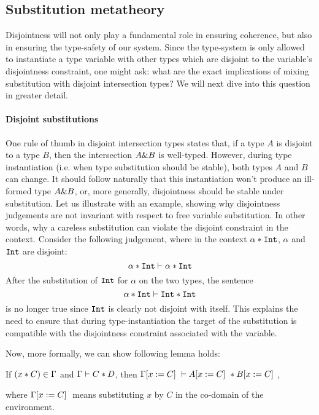 \subsection{Substitution metatheory}

Disjointness will not only play a fundamental role in ensuring coherence, but also in 
ensuring the type-safety of our system.
Since the type-system is only allowed to instantiate a type variable with 
other types which are disjoint to the variable's disjointness constraint, one might ask:
what are the exact implications of mixing substitution with disjoint intersection types? 
We will next dive into this question in greater detail.


\paragraph{Disjoint substitutions}
One rule of thumb in disjoint intersection types states that, if a type $A$ is 
disjoint to a type $B$, then the intersection $A \inter B$ is well-typed.
However, during type instantiation (i.e. when type substitution should be stable), both types
$A$ and $B$ can change.
It should follow naturally that this instantiation won't produce an ill-formed type $A \inter B$,
or, more generally, disjointness should be stable under substitution. 
Let us illustrate with an example, showing why disjointness judgements are not invariant with
respect to free variable substitution.
In other words, why a careless substitution can violate the disjoint constraint in the context. 
Consider the following judgement, where in the context $\alpha
\disjoint \tyint$, $\alpha$ and $\tyint$ are disjoint:
\[ \jdis {\alpha \disjoint \tyint} \alpha \tyint \]
After the substitution of $\tyint$ for $\alpha$ on the two types, the sentence
\[ \jdis {\alpha \disjoint \tyint} \tyint \tyint \]
is no longer true since $\tyint$ is clearly not disjoint with itself.
This explains the need to ensure that during type-instantiation the target of the substitution  
is compatible with the disjointness constraint associated with the variable. 

Now, more formally, we can show following lemma holds: 

\begin{lemma}
  \label{lemma:orthosubst}

  If $(x \disjoint C) \in \Gamma$ and $\jdis \Gamma C D$, 
  then $\jdis {\Gamma \subst C x} {A \subst C x} {B \subst C x}$,
\end{lemma}
where $\Gamma \subst C x$ means substituting $x$ by $C$ in the co-domain of the environment.

